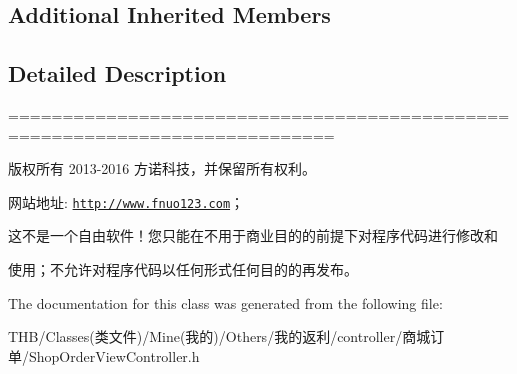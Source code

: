\subsection*{Additional Inherited Members}


\subsection{Detailed Description}
============================================================================

版权所有 2013-\/2016 方诺科技，并保留所有权利。

网站地址\+: \href{http://www.fnuo123.com}{\tt http\+://www.\+fnuo123.\+com}； 



这不是一个自由软件！您只能在不用于商业目的的前提下对程序代码进行修改和

使用；不允许对程序代码以任何形式任何目的的再发布。 

 

The documentation for this class was generated from the following file\+:\begin{DoxyCompactItemize}
\item 
T\+H\+B/\+Classes(类文件)/\+Mine(我的)/\+Others/我的返利/controller/商城订单/Shop\+Order\+View\+Controller.\+h\end{DoxyCompactItemize}
